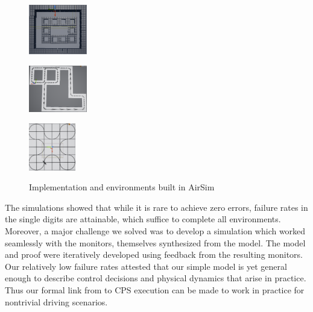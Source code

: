 \documentclass[12pt]{cmuthesis}
\theoremstyle{definition}
\theoremstyle{remark}
\begin{document}
\begin{figure}[tb]
\begin{minipage}[b]{0.15\textwidth}
\includegraphics[width=1in]{graphics/screen1.png}
\label{fig:rect}\end{minipage}
\begin{minipage}[b]{0.15\textwidth}\centering
\includegraphics[width=1in]{graphics/screen2.png}
\label{fig:turns}\end{minipage}
\begin{minipage}[b]{0.15\textwidth}\centering
\includegraphics[width=0.8in]{graphics/screen3.png}
\label{fig:clover}\end{minipage}
\caption{Implementation and environments built in AirSim}
\label{fig:patrol-plan}
\end{figure}
The simulations showed that while it is rare to achieve zero errors, failure rates in the single digits are attainable, which suffice to complete all environments.
Moreover, a major challenge we solved was to develop a simulation which worked seamlessly with the monitors, themselves synthesized from the model.
The model and proof were iteratively developed using feedback from the resulting monitors.
Our relatively low failure rates attested that our simple model is yet general enough to describe control decisions and physical dynamics that arise in practice.
Thus our formal link from \dL to CPS execution can be made to work in practice for nontrivial driving scenarios.
\end{document}
